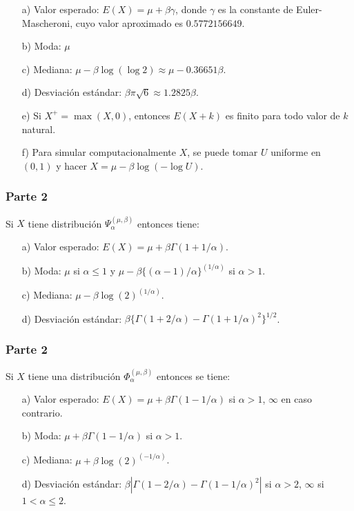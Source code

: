 \documentclass[
  oneside]{book}
\begin{document}
\begin{itemize}
  \item[a)] Valor esperado: $E(X) = \mu + \beta\gamma$, donde $\gamma$ es la constante de Euler-Mascheroni, cuyo valor aproximado es $0.5772156649$.
  \item[b)] Moda: $\mu$
  \item[c)] Mediana: $\mu - \beta \log(\log 2) \approx \mu - 0.36651 \beta$.
  \item[d)] Desviación estándar: $\beta \pi \sqrt{6} \approx 1.2825 \beta$.
  \item[e)] Si $X^+ = \max(X,0)$, entonces $E(X+k)$ es finito para todo valor de $k$ natural.
  \item[f)] Para simular computacionalmente $X$, se puede tomar $U$ uniforme en $(0,1)$ y hacer $X = \mu - \beta \log(-\log U)$.
\end{itemize}

\hypertarget{parte-2}{%
\subsubsection{Parte 2}\label{parte-2}}

Si \(X\) tiene distribución \(\Psi_{\alpha}^{(\mu,\beta)}\) entonces
tiene:

\begin{itemize}
  \item[a)] Valor esperado: $E(X) = \mu + \beta\Gamma(1+1/\alpha)$.
  \item[b)] Moda: $\mu$ si $\alpha\leq 1$ y $\mu-\beta\{(\alpha-1)/\alpha\}^{(1/\alpha)}$ si $\alpha>1$.
  \item[c)] Mediana: $\mu - \beta \log(2)^{(1/\alpha)}$.
  \item[d)] Desviación estándar: $\beta\{\Gamma(1+2/\alpha)-\Gamma(1+1/\alpha)^2\}^{1/2}$.
\end{itemize}

\hypertarget{parte-2-1}{%
\subsubsection{Parte 2}\label{parte-2-1}}

Si \(X\) tiene una distribución \(\Phi_{\alpha}^{(\mu, \beta)}\)
entonces se tiene:

\begin{itemize}
  \item[a)] Valor esperado: $E(X) = \mu + \beta\Gamma(1-1/\alpha)$ si $\alpha > 1$, $\infty$ en caso contrario.
  \item[b)] Moda: $\mu + \beta\Gamma(1-1/\alpha)$ si $\alpha>1$.
  \item[c)] Mediana: $\mu + \beta \log(2)^{(-1/\alpha)}$.
  \item[d)] Desviación estándar: $\beta|\Gamma(1-2/\alpha)-\Gamma(1-1/\alpha)^2|$ si $\alpha>2$, $\infty$ si $1<\alpha \leq 2$.
\end{itemize}
\end{document}
